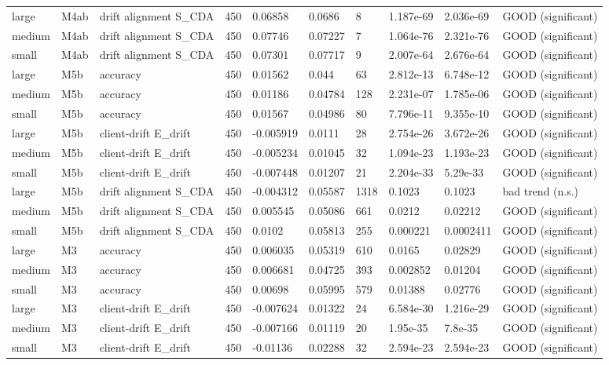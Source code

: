 \begin{table}[t]
\begin{tabular}{llllllllll}
large & M4ab & drift alignment S\_CDA & 450 & 0.06858 & 0.0686 & 8 & 1.187e-69 & 2.036e-69 & GOOD (significant) \\
medium & M4ab & drift alignment S\_CDA & 450 & 0.07746 & 0.07227 & 7 & 1.064e-76 & 2.321e-76 & GOOD (significant) \\
small & M4ab & drift alignment S\_CDA & 450 & 0.07301 & 0.07717 & 9 & 2.007e-64 & 2.676e-64 & GOOD (significant) \\
large & M5b & accuracy & 450 & 0.01562 & 0.044 & 63 & 2.812e-13 & 6.748e-12 & GOOD (significant) \\
medium & M5b & accuracy & 450 & 0.01186 & 0.04784 & 128 & 2.231e-07 & 1.785e-06 & GOOD (significant) \\
small & M5b & accuracy & 450 & 0.01567 & 0.04986 & 80 & 7.796e-11 & 9.355e-10 & GOOD (significant) \\
large & M5b & client-drift E\_drift & 450 & -0.005919 & 0.0111 & 28 & 2.754e-26 & 3.672e-26 & GOOD (significant) \\
medium & M5b & client-drift E\_drift & 450 & -0.005234 & 0.01045 & 32 & 1.094e-23 & 1.193e-23 & GOOD (significant) \\
small & M5b & client-drift E\_drift & 450 & -0.007448 & 0.01207 & 21 & 2.204e-33 & 5.29e-33 & GOOD (significant) \\
large & M5b & drift alignment S\_CDA & 450 & -0.004312 & 0.05587 & 1318 & 0.1023 & 0.1023 & bad trend (n.s.) \\
medium & M5b & drift alignment S\_CDA & 450 & 0.005545 & 0.05086 & 661 & 0.0212 & 0.02212 & GOOD (significant) \\
small & M5b & drift alignment S\_CDA & 450 & 0.0102 & 0.05813 & 255 & 0.000221 & 0.0002411 & GOOD (significant) \\
large & M3 & accuracy & 450 & 0.006035 & 0.05319 & 610 & 0.0165 & 0.02829 & GOOD (significant) \\
medium & M3 & accuracy & 450 & 0.006681 & 0.04725 & 393 & 0.002852 & 0.01204 & GOOD (significant) \\
small & M3 & accuracy & 450 & 0.00698 & 0.05995 & 579 & 0.01388 & 0.02776 & GOOD (significant) \\
large & M3 & client-drift E\_drift & 450 & -0.007624 & 0.01322 & 24 & 6.584e-30 & 1.216e-29 & GOOD (significant) \\
medium & M3 & client-drift E\_drift & 450 & -0.007166 & 0.01119 & 20 & 1.95e-35 & 7.8e-35 & GOOD (significant) \\
small & M3 & client-drift E\_drift & 450 & -0.01136 & 0.02288 & 32 & 2.594e-23 & 2.594e-23 & GOOD (significant) \\

\end{tabular}
\end{table}

